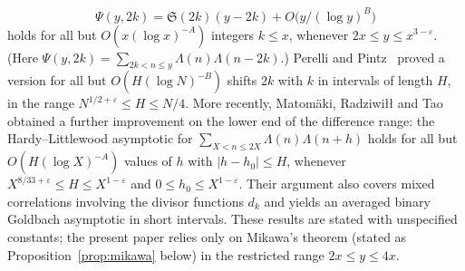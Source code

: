 \documentclass[11pt]{amsart}
\theoremstyle{definition}
\theoremstyle{remark}
\begin{document}
\[
\Psi(y,2k)=\mathfrak S(2k)(y-2k)+O\bigl(y/(\log y)^B\bigr)
\]
holds for all but $O(x(\log x)^{-A})$ integers $k\leq x$, whenever $2x\leq y\leq x^{3-\varepsilon}$. (Here $\Psi(y,2k)=\sum_{2k<n\leq y}\Lambda(n)\Lambda(n-2k)$.) Perelli and Pintz~\cite{perelli1992exceptional} proved a version for all but $O(H(\log N)^{-B})$ shifts $2k$ with $k$ in intervals of length $H$, in the range $N^{1/2+\varepsilon}\leq H\leq N/4$. More recently, Matom\"aki, Radziwi{\l}{\l} and Tao~\cite{matomaki2019correlations} obtained a further improvement on the lower end of the difference range: the Hardy--Littlewood asymptotic for $\sum_{X<n\leq 2X}\Lambda(n)\Lambda(n+h)$ holds for all but $O(H(\log X)^{-A})$ values of $h$ with $|h-h_0|\leq H$, whenever $X^{8/33+\varepsilon}\leq H\leq X^{1-\varepsilon}$ and $0\leq h_0\leq X^{1-\varepsilon}$. Their argument also covers mixed correlations involving the divisor functions $d_k$ and yields an averaged binary Goldbach asymptotic in short intervals. These results are stated with unspecified constants; the present paper relies only on Mikawa's theorem (stated as Proposition~\ref{prop:mikawa} below) in the restricted range $2x\leq y\leq 4x$.
\end{document}
